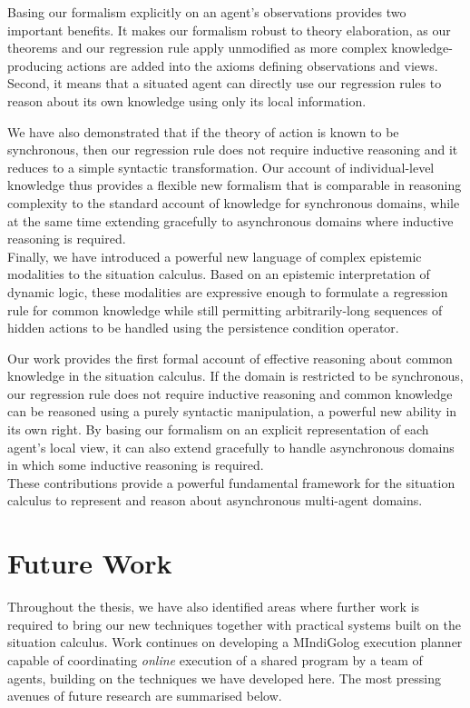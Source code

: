 Basing our formalism explicitly on an agent's observations provides
two important benefits. It makes our formalism robust to theory elaboration,
as our theorems and our regression rule apply unmodified as more complex
knowledge-producing actions are added into the axioms defining observations
and views. Second, it means that a situated agent can directly use
our regression rules to reason about its own knowledge using only
its local information.

We have also demonstrated that if the theory of action is known to
be synchronous, then our regression rule does not require inductive
reasoning and it reduces to a simple syntactic transformation. Our
account of individual-level knowledge thus provides a flexible new
formalism that is comparable in reasoning complexity to the standard
account of knowledge for synchronous domains, while at the same time
extending gracefully to asynchronous domains where inductive reasoning
is required.\\


Finally, we have introduced a powerful new language of complex epistemic
modalities to the situation calculus. Based on an epistemic interpretation
of dynamic logic, these modalities are expressive enough to formulate
a regression rule for common knowledge while still permitting arbitrarily-long
sequences of hidden actions to be handled using the persistence condition
operator.

Our work provides the first formal account of effective reasoning
about common knowledge in the situation calculus. If the domain is
restricted to be synchronous, our regression rule does not require
inductive reasoning and common knowledge can be reasoned using a purely
syntactic manipulation, a powerful new ability in its own right. By
basing our formalism on an explicit representation of each agent's
local view, it can also extend gracefully to handle asynchronous domains
in which some inductive reasoning is required.\\


These contributions provide a powerful fundamental framework for the
situation calculus to represent and reason about asynchronous multi-agent
domains.


\section{Future Work}

Throughout the thesis, we have also identified areas where further
work is required to bring our new techniques together with practical
systems built on the situation calculus. Work continues on developing
a MIndiGolog execution planner capable of coordinating \emph{online}
execution of a shared program by a team of agents, building on the
techniques we have developed here. The most pressing avenues of future
research are summarised below.

